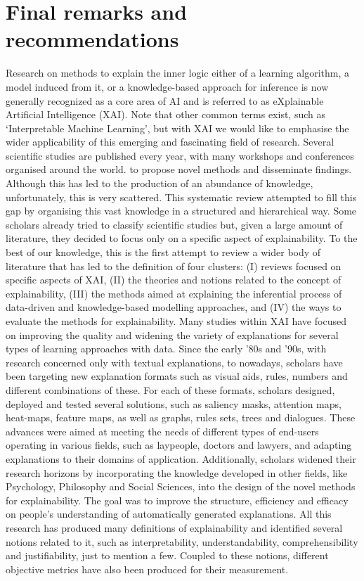 \documentclass[final,1p,times]{elsarticle}
\begin{document}
\section{Final remarks and recommendations}\label{conclusions}
Research on methods to explain the inner logic either of a learning algorithm, a model induced from it, or a knowledge-based approach for inference is now generally recognized as a core area of AI and is referred to as eXplainable Artificial Intelligence (XAI). 
Note that other common terms exist, such as `Interpretable Machine Learning', but with XAI we would like to emphasise the wider applicability of this emerging and fascinating field of research.
Several scientific studies are published every year, with many workshops and conferences organised around the world. to propose novel methods and disseminate findings. Although this has led to the production of an abundance of knowledge, unfortunately, this is very scattered. 
This systematic review attempted to fill this gap by organising this vast knowledge in a structured and hierarchical way. Some scholars already tried to classify scientific studies but, given a large amount of literature, they decided to focus only on a specific aspect of explainability. To the best of our knowledge, this is the first attempt to review a wider body of literature that has led to the definition of four clusters: (I) reviews focused on specific aspects of XAI, (II) the theories and notions related to the concept of explainability, (III) the methods aimed at explaining the inferential process of data-driven and knowledge-based modelling approaches, and (IV) the ways to evaluate the methods for explainability.
Many studies within XAI have focused on improving the quality and widening the variety of explanations for several types of learning approaches with data. 
Since the early '80s and '90s, with research concerned only with textual explanations, to nowadays, scholars have been targeting new explanation formats such as visual aids, rules, numbers and different combinations of these.
For each of these formats, scholars designed, deployed and tested several solutions, such as saliency masks, attention maps, heat-maps, feature maps, as well as graphs, rules sets, trees and dialogues. These advances were aimed at meeting the needs of different types of end-users operating in various fields, such as laypeople, doctors and lawyers, and adapting explanations to their domains of application.
Additionally, scholars widened their research horizons by incorporating the knowledge developed in other fields, like Psychology, Philosophy and Social Sciences, into the design of the novel methods for explainability. The goal was to improve the structure, efficiency and efficacy on people's understanding of automatically generated explanations. All this research has produced many definitions of explainability and identified several notions related to it, such as interpretability, understandability, comprehensibility and justifiability, just to mention a few. Coupled to these notions, different objective metrics have also been produced for their measurement.
\end{document}
